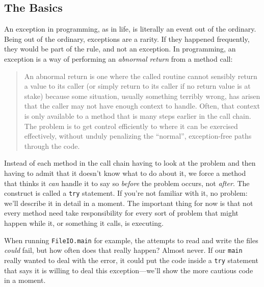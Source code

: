 \subsection{The Basics}
An exception in programming, as in life, is literally an event out of the
ordinary.  Being out of the ordinary, exceptions are a rarity. If they
happened frequently, they would be part of the rule, and not an exception.
In programming, an exception is a way of performing an {\em abnormal return}
from a method call: 
\begin{quote}
An abnormal return is one where the called routine cannot sensibly return a
value to its caller (or simply return to its caller if no return value is at
stake) because some situation, usually something terribly wrong, has arisen
that the caller may not have enough context to handle.  Often, that context is
only available to a method that is many steps earlier in the call chain.  The
problem is to get control efficiently to where it can be exercised effectively,
without unduly penalizing the ``normal'', exception-free paths through the code.
\end{quote}

Instead of each method in the call chain having to look at the
problem and then having to admit that it doesn't know what to do
about it, we force a method that thinks it {\em can} handle it to say so {\em before}
the problem occurs, not {\em after}. The
construct is called a {\tt try} statement.  If you're not familiar with
it, no problem: we'll describe it in detail in a moment.  The important thing
for now is that not every method need take responsibility for every sort of
problem that might happen while it, or something it calls, is executing.

When running {\tt FileIO.main} for example, the attempts to read and write the
files {\em could} fail, but how often does that really happen? Almost never.
If our {\tt main} really wanted to deal with the
error, it could put the code inside a {\tt try} statement that says it is
willing to deal this exception---we'll show the more cautious code in a
moment.


